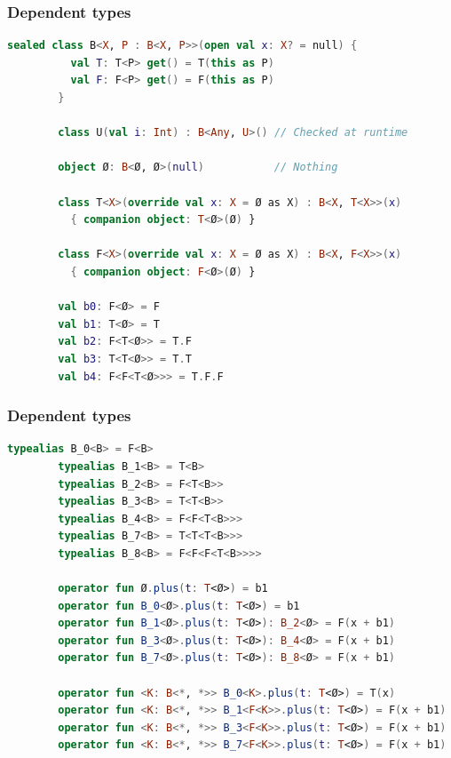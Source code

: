 \documentclass{beamer}
\begin{document}
    \begin{frame}[fragile]
        \frametitle{Dependent types}
        \begin{lstlisting}[language=Kotlin, gobble=7]
        sealed class B<X, P : B<X, P>>(open val x: X? = null) {
          val T: T<P> get() = T(this as P)
          val F: F<P> get() = F(this as P)
        }

        class U(val i: Int) : B<Any, U>() // Checked at runtime

        object Ø: B<Ø, Ø>(null)           // Nothing

        class T<X>(override val x: X = Ø as X) : B<X, T<X>>(x)
          { companion object: T<Ø>(Ø) }

        class F<X>(override val x: X = Ø as X) : B<X, F<X>>(x)
          { companion object: F<Ø>(Ø) }

        val b0: F<Ø> = F
        val b1: T<Ø> = T
        val b2: F<T<Ø>> = T.F
        val b3: T<T<Ø>> = T.T
        val b4: F<F<T<Ø>>> = T.F.F
        \end{lstlisting}
    \end{frame}

    \begin{frame}[fragile]
        \frametitle{Dependent types}
        \begin{lstlisting}[language=Kotlin, gobble=7]
        typealias B_0<B> = F<B>
        typealias B_1<B> = T<B>
        typealias B_2<B> = F<T<B>>
        typealias B_3<B> = T<T<B>>
        typealias B_4<B> = F<F<T<B>>>
        typealias B_7<B> = T<T<T<B>>>
        typealias B_8<B> = F<F<F<T<B>>>>

        operator fun Ø.plus(t: T<Ø>) = b1
        operator fun B_0<Ø>.plus(t: T<Ø>) = b1
        operator fun B_1<Ø>.plus(t: T<Ø>): B_2<Ø> = F(x + b1)
        operator fun B_3<Ø>.plus(t: T<Ø>): B_4<Ø> = F(x + b1)
        operator fun B_7<Ø>.plus(t: T<Ø>): B_8<Ø> = F(x + b1)

        operator fun <K: B<*, *>> B_0<K>.plus(t: T<Ø>) = T(x)
        operator fun <K: B<*, *>> B_1<F<K>>.plus(t: T<Ø>) = F(x + b1)
        operator fun <K: B<*, *>> B_3<F<K>>.plus(t: T<Ø>) = F(x + b1)
        operator fun <K: B<*, *>> B_7<F<K>>.plus(t: T<Ø>) = F(x + b1)
        \end{lstlisting}
    \end{frame}
\end{document}
